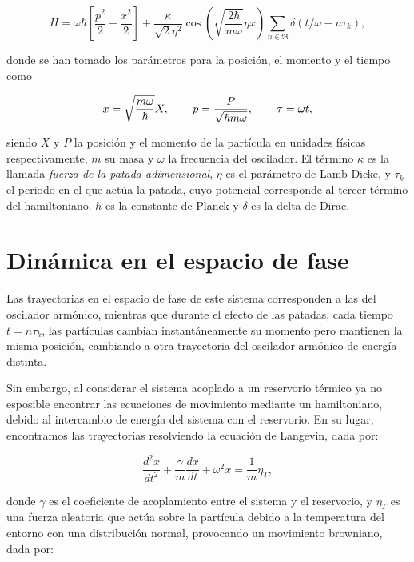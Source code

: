 \documentclass[letterpaper,12pt,oneside]{book}
\begin{document}
	\begin{equation}\label{Hamiltoniano}
		H = \omega \hbar \left[ \frac{p^2}{2} + \frac{x^2}{2} \right] + \frac{\kappa}{\sqrt{2}\eta^2} \cos \left( \sqrt{\frac{2\hbar}{m\omega}}\eta x  \right) \sum_{n\in\Re}\delta(t/\omega - n\tau_k),
	\end{equation}
	
	\noindent donde se han tomado los par\'ametros para la posici\'on, el momento y el tiempo como 
	
	\begin{equation}\label{CambioVariables}
		x = \sqrt{\frac{m\omega}{\hbar}}X, \verb|    | p = \frac{P}{\sqrt{\hbar m \omega}}, \verb|    | \tau = \omega t,
	\end{equation}
	
	\noindent siendo $X$ y $P$ la posici\'on y el momento de la part\'icula en unidades f\'isicas respectivamente, $m$ su masa y $\omega$ la frecuencia del oscilador. El t\'ermino $\kappa$ es la llamada \textit{fuerza de la patada adimensional}, $\eta$ es el par\'ametro de Lamb-Dicke, y $\tau_k$ el periodo en el que act\'ua la patada, cuyo potencial corresponde al tercer t\'ermino del hamiltoniano. $\hbar$ es la constante de Planck y $\delta$ es la delta de Dirac.
	
	\section{Din\'amica en el espacio de fase}
	
	Las trayectorias en el espacio de fase de este sistema corresponden a las del oscilador arm\'onico, mientras que durante el efecto de las patadas, cada tiempo $t = n\tau_k$, las part\'iculas cambian instant\'aneamente su momento pero mantienen la misma posici\'on, cambiando a otra trayectoria del oscilador arm\'onico de energ\'ia distinta.
	
	Sin embargo, al considerar el sistema acoplado a un reservorio t\'ermico ya no esposible encontrar las ecuaciones de movimiento mediante un hamiltoniano, debido al intercambio de energ\'ia del sistema con el reservorio. En su lugar, encontramos las trayectorias resolviendo la ecuaci\'on de Langevin, dada por: 
	
	\begin{equation}\label{LangevinOriginal}
		\frac{d^2x}{dt^2} + \frac{\gamma}{m}\frac{dx}{dt} + \omega^2 x = \frac{1}{m}\eta_T,
	\end{equation}
	
	\noindent donde $\gamma$ es el coeficiente de acoplamiento entre el sistema y el reservorio, y $\eta_T$ es una fuerza aleatoria que act\'ua sobre la part\'icula debido a la temperatura del entorno  con una distribuci\'on normal, provocando un movimiento browniano, dada por:
	
\end{document}
